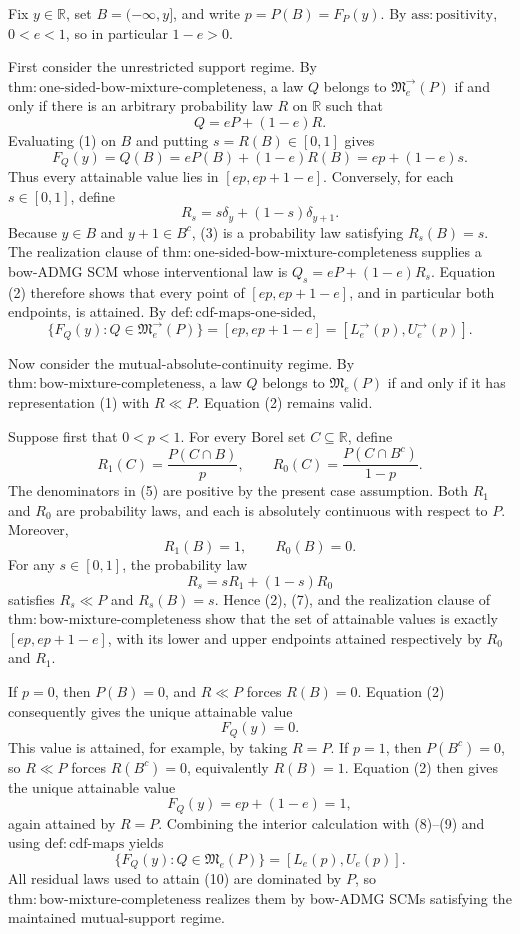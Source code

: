 Fix \(y\in\mathbb R\), set \(B=(-\infty,y]\), and write \(p=P(B)=F_P(y)\).  By \(\mathrm{ass:positivity}\), \(0<e<1\), so in particular \(1-e>0\).

First consider the unrestricted support regime.  By \(\mathrm{thm:one\text{-}sided\text{-}bow\text{-}mixture\text{-}completeness}\), a law \(Q\) belongs to \(\mathfrak M^{\to}_e(P)\) if and only if there is an arbitrary probability law \(R\) on \(\mathbb R\) such that
\[
Q=eP+(1-e)R.
\tag{1}
\]
Evaluating (1) on \(B\) and putting \(s=R(B)\in[0,1]\) gives
\[
F_Q(y)=Q(B)=eP(B)+(1-e)R(B)=ep+(1-e)s.
\tag{2}
\]
Thus every attainable value lies in \([ep,ep+1-e]\).  Conversely, for each \(s\in[0,1]\), define
\[
R_s=s\delta_y+(1-s)\delta_{y+1}.
\tag{3}
\]
Because \(y\in B\) and \(y+1\in B^c\), (3) is a probability law satisfying \(R_s(B)=s\).  The realization clause of \(\mathrm{thm:one\text{-}sided\text{-}bow\text{-}mixture\text{-}completeness}\) supplies a bow-ADMG SCM whose interventional law is \(Q_s=eP+(1-e)R_s\).  Equation (2) therefore shows that every point of \([ep,ep+1-e]\), and in particular both endpoints, is attained.  By \(\mathrm{def:cdf\text{-}maps\text{-}one\text{-}sided}\),
\[
\{F_Q(y):Q\in\mathfrak M^{\to}_e(P)\}
=[ep,ep+1-e]
=[L^{\to}_e(p),U^{\to}_e(p)].
\tag{4}
\]

Now consider the mutual-absolute-continuity regime.  By \(\mathrm{thm:bow\text{-}mixture\text{-}completeness}\), a law \(Q\) belongs to \(\mathfrak M_e(P)\) if and only if it has representation (1) with \(R\ll P\).  Equation (2) remains valid.

Suppose first that \(0<p<1\).  For every Borel set \(C\subseteq\mathbb R\), define
\[
R_1(C)=\frac{P(C\cap B)}{p},
\qquad
R_0(C)=\frac{P(C\cap B^c)}{1-p}.
\tag{5}
\]
The denominators in (5) are positive by the present case assumption.  Both \(R_1\) and \(R_0\) are probability laws, and each is absolutely continuous with respect to \(P\).  Moreover,
\[
R_1(B)=1,
\qquad
R_0(B)=0.
\tag{6}
\]
For any \(s\in[0,1]\), the probability law
\[
R_s=sR_1+(1-s)R_0
\tag{7}
\]
satisfies \(R_s\ll P\) and \(R_s(B)=s\).  Hence (2), (7), and the realization clause of \(\mathrm{thm:bow\text{-}mixture\text{-}completeness}\) show that the set of attainable values is exactly \([ep,ep+1-e]\), with its lower and upper endpoints attained respectively by \(R_0\) and \(R_1\).

If \(p=0\), then \(P(B)=0\), and \(R\ll P\) forces \(R(B)=0\).  Equation (2) consequently gives the unique attainable value
\[
F_Q(y)=0.
\tag{8}
\]
This value is attained, for example, by taking \(R=P\).  If \(p=1\), then \(P(B^c)=0\), so \(R\ll P\) forces \(R(B^c)=0\), equivalently \(R(B)=1\).  Equation (2) then gives the unique attainable value
\[
F_Q(y)=ep+(1-e)=1,
\tag{9}
\]
again attained by \(R=P\).  Combining the interior calculation with (8)--(9) and using \(\mathrm{def:cdf\text{-}maps}\) yields
\[
\{F_Q(y):Q\in\mathfrak M_e(P)\}
=[L_e(p),U_e(p)].
\tag{10}
\]
All residual laws used to attain (10) are dominated by \(P\), so \(\mathrm{thm:bow\text{-}mixture\text{-}completeness}\) realizes them by bow-ADMG SCMs satisfying the maintained mutual-support regime.

